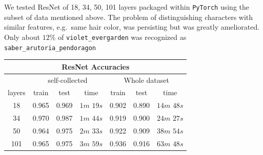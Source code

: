 \documentclass[11.5pt]{article}
\begin{document}
\begin{enumerate}
\begin{itemize}
            \vspace{3mm}

            \begin{minipage}{0.35\textwidth}
                We tested ResNet of 18, 34, 50, 101 layers packaged within \texttt{PyTorch}\cite{pytorch} using the subset of data mentioned above.
                The problem of distinguishing characters with similar features, e.g.\ same hair color, was persisting but was greatly ameliorated.
                Only about $12\%$ of \texttt{violet\_evergarden} was recognized as \texttt{saber\_arutoria\_pendoragon}
            \end{minipage}
            \begin{minipage}{0.45\textwidth}           
                \begin{tabular}{|c|c|c|c|c|c|c|}
                    \multicolumn{7}{c}{
                        \textbf{ResNet Accuracies}
                    }\\
                    \hline
                    & \multicolumn{3}{|c|}{self-collected} & \multicolumn{3}{|c|}{Whole dataset} \\ \hline
                    layers & train & test & time & train & test & time \\ \hline
                    18 & 0.965 & 0.969 & $1m$ $19s$ & 0.902 & 0.890 & $14m$ $48s$ \\ \hline
                    34  & 0.970 & 0.987 & $1m$ $44s$ & 0.919 & 0.900 & $24m$ $27s$ \\ \hline
                    50 & 0.964 & 0.975 & $2m$ $33s$ & 0.922 & 0.909 & $38m$ $54s$ \\ \hline
                    101 & 0.965 & 0.975 & $3m$ $59s$ & 0.936 & 0.916 & $63m$ $48s$ \\ \hline
                \end{tabular}
            \end{minipage}          
        \end{itemize}
    \end{enumerate}
\end{document}
